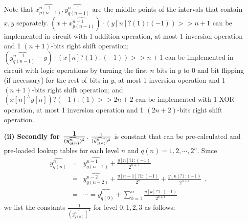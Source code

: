 \documentclass[conference]{IEEEtran}
\begin{document}
Note that $\widehat{x_{p(n-1)}^{n-1}}, \widehat{y_{q(n-1)}^{n-1}}$ are the middle points of the intervals that contain $x, y$ separately.
$(x+\widehat{x_{p(n-1)}^{n-1}})\cdot(y[n]?(1):(-1))>>n+1$ can be implemented in circuit with 1 addition operation, at most 1 inversion operation and 1 $(n+1)$-bits right shift operation;
$(\widehat{y_{q(n-1)}^{n-1}}-y)\cdot(x[n]?(1):(-1))>>n+1$ can be implemented in circuit with logic operations by turning the first $n$ bits in $y$ to 0 and bit flipping (if necessary) for the rest of bits in $y$, at most 1 inversion operation and 1 $(n+1)$-bits right shift operation; and
$(x[n]^{\wedge} y[n])?(-1):(1)>>2n+2$
 can be implemented with 1 XOR operation, at most 1 inversion operation and 1 $(2n+2)$-bits right shift operation.

{\bf (ii)\;\; Secondly for ${\boldsymbol {1\over(\widehat{y_{q(n)}^{n}})^{2}}}$}. ${1\over(\widehat{y_{q(n)}^{n}})^{2}}$ is constant that can be pre-calculated and pre-loaded lookup tables for each level $n$ and $q(n)=1, 2,\cdots, 2^{n}$. Since $$\begin{array}{rcl}
\widehat{y_{q(n)}^{n}}&=&\widehat{y_{q(n-1)}^{n-1}}+\frac{y[n]?1:(-1)}{2^{n+1}}\\
&=&\widehat{y_{q(n-2)}^{n-2}}+\frac{y[n-1]?1:(-1)}{2^{n}}+\frac{y[n]?1:(-1)}{2^{n+1}}\\
&=&\cdots=\widehat{y_{q(0)}^{0}}+\sum\limits_{k=1}^{n}\frac{y[k]?1:(-1)}{2^{k+1}}
\end{array},$$
we list the constants $\frac{1}{(\widehat{y^{n}_{q(n)}})^2}$ for level $0,1,2,3$ as follows:
\end{document}

